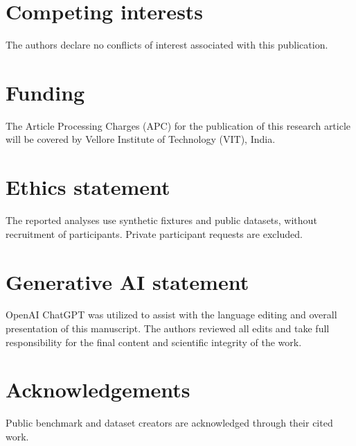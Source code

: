 \documentclass[pdflatex,sn-nature]{sn-jnl}
\begin{document}
\section*{Competing interests}
The authors declare no conflicts of interest associated with this publication.

\section*{Funding}
The Article Processing Charges (APC) for the publication of this research article will be covered by Vellore Institute of Technology (VIT), India.

\section*{Ethics statement}
The reported analyses use synthetic fixtures and public datasets, without recruitment of participants. Private participant requests are excluded.

\section*{Generative AI statement}
OpenAI ChatGPT was utilized to assist with the language editing and overall presentation of this manuscript. The authors reviewed all edits and take full responsibility for the final content and scientific integrity of the work.

\section*{Acknowledgements}
Public benchmark and dataset creators are acknowledged through their cited work.



\end{document}
